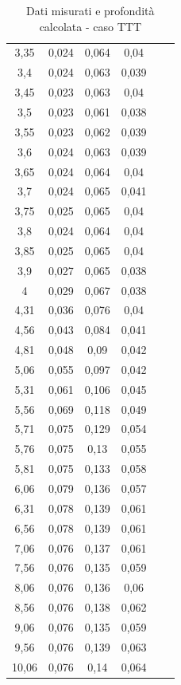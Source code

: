 \documentclass[12pt]{article} %
\begin{document}
\begin{table}[H]
\begin{tabular}{cccccc}
 3,35  &  0,024 &  0,064 &  0,04  &  &  \\
 3,4   &  0,024 &  0,063 &  0,039 &  &  \\
 3,45  &  0,023 &  0,063 &  0,04  &  &  \\
 3,5   &  0,023 &  0,061 &  0,038 &  &  \\
 3,55  &  0,023 &  0,062 &  0,039 &  &  \\
 3,6   &  0,024 &  0,063 &  0,039 &  &  \\
 3,65  &  0,024 &  0,064 &  0,04  &  &  \\
 3,7   &  0,024 &  0,065 &  0,041 &  &  \\
 3,75  &  0,025 &  0,065 &  0,04  &  &  \\
 3,8   &  0,024 &  0,064 &  0,04  &  &  \\
 3,85  &  0,025 &  0,065 &  0,04  &  &  \\
 3,9   &  0,027 &  0,065 &  0,038 &  &  \\
 4     &  0,029 &  0,067 &  0,038 &  &  \\
 4,31  &  0,036 &  0,076 &  0,04  &  &  \\
 4,56  &  0,043 &  0,084 &  0,041 &  &  \\
 4,81  &  0,048 &  0,09  &  0,042 &  &  \\
 5,06  &  0,055 &  0,097 &  0,042 &  &  \\
 5,31  &  0,061 &  0,106 &  0,045 &  &  \\
 5,56  &  0,069 &  0,118 &  0,049 &  &  \\
 5,71  &  0,075 &  0,129 &  0,054 &  &  \\
 5,76  &  0,075 &  0,13  &  0,055 &  &  \\
 5,81  &  0,075 &  0,133 &  0,058 &  &  \\
 6,06  &  0,079 &  0,136 &  0,057 &  &  \\
 6,31  &  0,078 &  0,139 &  0,061 &  &  \\
 6,56  &  0,078 &  0,139 &  0,061 &  &  \\
 7,06  &  0,076 &  0,137 &  0,061 &  &  \\
 7,56  &  0,076 &  0,135 &  0,059 &  &  \\
 8,06  &  0,076 &  0,136 &  0,06  &  &  \\
 8,56  &  0,076 &  0,138 &  0,062 &  &  \\
 9,06  &  0,076 &  0,135 &  0,059 &  &  \\
 9,56  &  0,076 &  0,139 &  0,063 &  &  \\
 10,06 &  0,076 &  0,14  &  0,064 &  & 
\end{tabular}
\caption{Dati misurati e profondità calcolata - caso TTT}
\label{tab:TTT}
\end{table}
\vspace*{\fill}
\newpage
\end{document}
